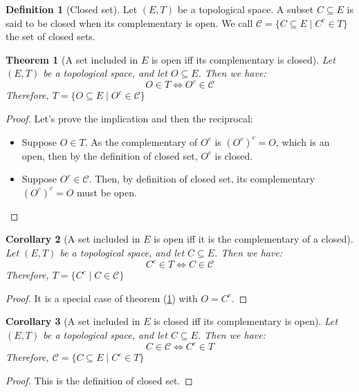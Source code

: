 \documentclass{article}
\newtheorem{theorem}{Theorem}[section]
\newtheorem{corollary}[theorem]{Corollary}
\theoremstyle{definition}
\newtheorem{definition}{Definition}[section]
\theoremstyle{remark}
\theoremstyle{example}
\theoremstyle{notation}
\newcommand{\closed}{\mathcal{C}}
\begin{document}
\begin{definition}[Closed set]
		Let $(E, T)$ be a topological space. A subset $C \subseteq E$ is said to be closed when its complementary is open. We call $\closed = \{C \subseteq E \mid C^c \in T\}$ the set of closed sets.
\end{definition}

\begin{theorem}[A set included in $E$ is open iff its complementary is closed] \label{thm:open-iff-comp-is-closed}
		Let $(E, T)$ be a topological space, and let $O \subseteq E$. Then we have:
				$$O \in T \iff O^c \in \closed$$
		Therefore, $T = \{O \subseteq E \mid O^c \in \closed\}$
\end{theorem}

\begin{proof}
		Let's prove the implication and then the reciprocal:
		\begin{itemize}
				\item Suppose $O \in T$. As the complementary of $O^c$ is $(O^c)^c = O$, which is an open, then by the definition of closed set, $O^c$ is closed.
				\item Suppose $O^c \in \closed$. Then, by definition of closed set, its complementary $(O^c)^c = O$ must be open.
		\end{itemize}
\end{proof}

\begin{corollary}[A set included in $E$ is open iff it is the complementary of a closed]
		Let $(E, T)$ be a topological space, and let $C \subseteq E$. Then we have:
				$$C^c \in T \iff C \in \closed$$
		Therefore, $T = \{C^c \mid C \in \closed\}$
\end{corollary}

\begin{proof}
		It is a special case of theorem (\ref{thm:open-iff-comp-is-closed}) with $O = C^c$.
\end{proof}

\begin{corollary}[A set included in $E$ is closed iff its complementary is open] \label{cor:closed-iff-comp-is-open}
		Let $(E, T)$ be a topological space, and let $C \subseteq E$. Then we have:
				$$C \in \closed \iff C^c \in T$$
		Therefore, $\closed = \{C \subseteq E \mid C^c \in T\}$
\end{corollary}

\begin{proof}
		This is the definition of closed set.%
\end{proof}
\end{document}
